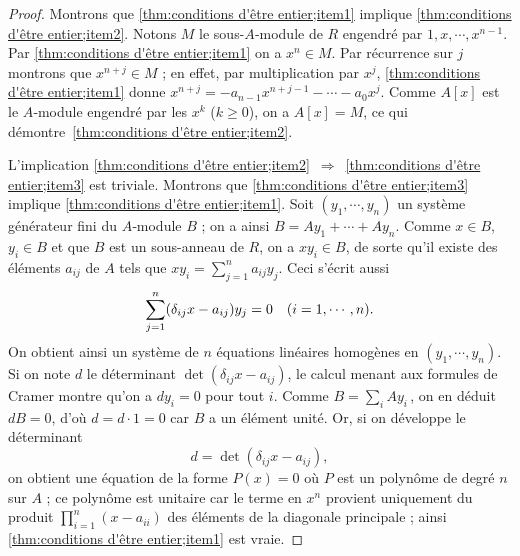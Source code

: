 \documentclass[11pt, useosf,
  title in boldface,
  theorem in new line,
  theorem numbering = section,
  number theorems separately,
]{simplivre}
\begin{document}
    \begin{proof}
        Montrons que \ref{thm:conditions d'être entier;item1} implique \ref{thm:conditions d'être entier;item2}. Notons \( M \) le sous-\( A \)‑module de \( R \) engendré par \( 1, x, \cdots, x^{n-1} \). Par \ref{thm:conditions d'être entier;item1} on a \( x^n \in M \). Par récurrence sur \( j \) montrons que \( x^{n+j} \in M \) ; en effet, par multiplication par \( x^j \), \ref{thm:conditions d'être entier;item1} donne \( x^{n+j} = - a_{n-1}x^{n+j-1} - \cdots - a_0 x^j \). Comme \( A[x] \) est le \( A \)‑module engendré par les \( x^k \) (\( k \geqslant 0 \)), on a \( A[x] = M \), ce qui démontre~\ref{thm:conditions d'être entier;item2}.

        L'implication \ref{thm:conditions d'être entier;item2}~\( \Rightarrow \)~\ref{thm:conditions d'être entier;item3} est triviale. Montrons que \ref{thm:conditions d'être entier;item3} implique \ref{thm:conditions d'être entier;item1}. Soit \( (y_1, \cdots, y_n) \) un système générateur fini du \( A \)‑module \( B \) ; on a ainsi \( B = Ay_1 + \cdots + Ay_n \). Comme \( x \in B \), \( y_i \in B \) et que \( B \) est un sous-anneau de \( R \), on a \( x y_i \in B \), de sorte qu'il existe des éléments \( a_{ij} \) de \( A \) tels que \( x y_i = \sum_{j=1}^n a_{ij}y_j \). Ceci s'écrit aussi
        \[
            \sum_{j=1}^n (\delta_{ij}x - a_{ij})y_j = 0 \quad \text{(\( i = 1, \cdots, n \))}.
        \]
        On obtient ainsi un système de \( n \) équations linéaires homogènes en \( (y_1, \cdots, y_n) \). Si on note \( d \) le déterminant \( \det(\delta_{ij}x - a_{ij}) \), le calcul menant aux formules de Cramer montre qu'on a \( d y_i = 0 \) pour tout \( i \). Comme \( B = \sum_i A y_i \)\,, on en déduit \( d B = 0 \), d'où \( d = d \cdot 1 = 0 \) car \( B \) a un élément unité. Or, si on développe le déterminant
        \[
            d = \det(\delta_{ij}x - a_{ij}),
        \]
        on obtient une équation de la forme \( P(x) = 0 \) où \( P \) est un polynôme de degré \( n \) sur \( A \) ; ce polynôme est unitaire car le terme en \( x^n \) provient uniquement du produit \( \prod_{i=1}^n (x-a_{ii}) \) des éléments de la diagonale principale ; ainsi \ref{thm:conditions d'être entier;item1} est vraie.
    \end{proof}
\end{document}
